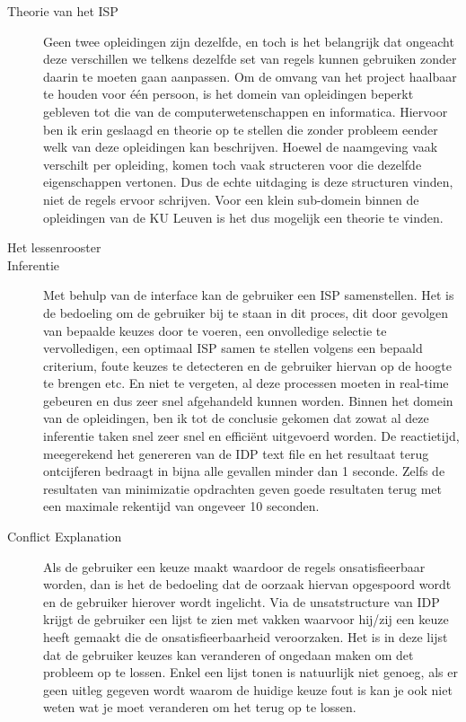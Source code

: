 \begin{description}
\item [Theorie van het ISP] Geen twee opleidingen zijn dezelfde, en toch is het belangrijk dat ongeacht deze verschillen we telkens dezelfde set van regels kunnen gebruiken zonder daarin te moeten gaan aanpassen. Om de omvang van het project haalbaar te houden voor \'{e}\'{e}n persoon, is het domein van opleidingen beperkt gebleven tot die van de computerwetenschappen en informatica. Hiervoor ben ik erin geslaagd en theorie op te stellen die zonder probleem eender welk van deze opleidingen kan beschrijven. Hoewel de naamgeving vaak verschilt per opleiding, komen toch vaak structeren voor die dezelfde eigenschappen vertonen. Dus de echte uitdaging is deze structuren vinden, niet de regels ervoor schrijven. Voor een klein sub-domein binnen de opleidingen van de KU Leuven is het dus mogelijk een theorie te vinden. 

\item [Het lessenrooster] 

\item [Inferentie] Met behulp van de interface kan de gebruiker een ISP samenstellen. Het is de bedoeling om de gebruiker bij te staan in dit proces, dit door gevolgen van bepaalde keuzes door te voeren, een onvolledige selectie te vervolledigen, een optimaal ISP samen te stellen volgens een bepaald criterium, foute keuzes te detecteren en de gebruiker hiervan op de hoogte te brengen etc. En niet te vergeten, al deze processen moeten in real-time gebeuren en dus zeer snel afgehandeld kunnen worden. Binnen het domein van de opleidingen, ben ik tot de conclusie gekomen dat zowat al deze inferentie taken snel zeer snel en effici\"{e}nt uitgevoerd worden. De reactietijd, meegerekend het genereren van de IDP text file en het resultaat terug ontcijferen bedraagt in bijna alle gevallen minder dan 1 seconde. Zelfs de resultaten van minimizatie opdrachten geven goede resultaten terug met een maximale rekentijd van ongeveer 10 seconden. 

\item [Conflict Explanation] Als de gebruiker een keuze maakt waardoor de regels onsatisfieerbaar worden, dan is het de bedoeling dat de oorzaak hiervan opgespoord wordt en de gebruiker hierover wordt ingelicht. Via de unsatstructure van IDP krijgt de gebruiker een lijst te zien met vakken waarvoor hij/zij een keuze heeft gemaakt die de onsatisfieerbaarheid veroorzaken. Het is in deze lijst dat de gebruiker keuzes kan veranderen of ongedaan maken om det probleem op te lossen. Enkel een lijst tonen is natuurlijk niet genoeg, als er geen uitleg gegeven wordt waarom de huidige keuze fout is kan je ook niet weten wat je moet veranderen om het terug op te lossen. 

\end{description}